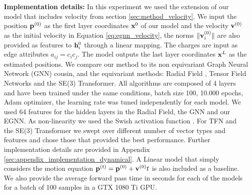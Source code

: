 \textbf{Implementation details:} In this experiment we used the extension of our model that includes velocity from section \ref{sec:method_velocity}. We input the position $\mathbf{p}^{(0)}$ as the first layer coordinates $\mathbf{x}^0$ of our model and the velocity $\mathbf{v}^{(0)}$ as the initial velocity in Equation \ref{eq:egnn_velocity}, the norms $\|\mathbf{v}_i^{(0)} \|$ are also provided as features to $\mathbf{h}_i^0$ through a linear mapping. The charges are input as edge attributes $a_{ij} = c_i c_j$. The model outputs the last layer coordinates $\mathbf{x}^L$ as the estimated positions.
We compare our method to its non equivariant Graph Neural Network (GNN) cousin, and the equivariant methods: Radial Field \cite{kohler2019equivariant_workshop}, Tensor Field Networks and the SE(3) Transformer. All algorithms are composed of 4 layers and have been trained under the same conditions, batch size 100, 10.000 epochs, Adam optimizer, the learning rate was tuned independently for each model. We used 64 features for the hidden layers in the Radial Field, the GNN and our EGNN. As non-linearity we used the Swish activation function \cite{ramachandran2017searching}. For TFN and the SE(3) Transformer we swept over different number of vector types and features and chose those that provided the best performance. Further implementation details are provided in Appendix \ref{sec:appendix_implementation_dynamical}. A Linear model that simply considers the motion equation $\mathbf{p}^{(t)} = \mathbf{p}^{(0)} + \mathbf{v}^{(0)}t$ is also included as a baseline. We also provide the average forward pass time in seconds for each of the models for a batch of 100 samples in a GTX 1080 Ti GPU.



